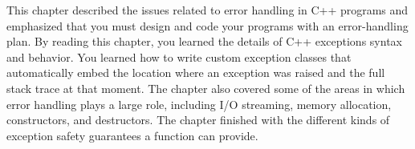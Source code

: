 This chapter described the issues related to error handling in C++ programs and emphasized that you must design and code your programs with an error-handling plan. By reading this chapter, you learned the details of C++ exceptions syntax and behavior. You learned how to write custom exception classes that automatically embed the location where an exception was raised and the full stack trace at that moment. The chapter also covered some of the areas in which error handling plays a large role, including I/O streaming, memory allocation, constructors, and destructors. The chapter finished with the different kinds of exception safety guarantees a function can provide.